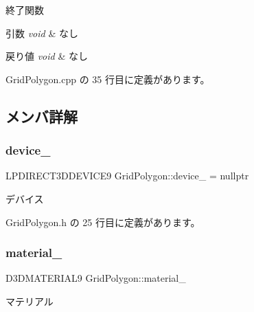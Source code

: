 終了関数 


\begin{DoxyParams}{引数}
{\em void} & なし \\
\hline
\end{DoxyParams}

\begin{DoxyRetVals}{戻り値}
{\em void} & なし \\
\hline
\end{DoxyRetVals}


 Grid\+Polygon.\+cpp の 35 行目に定義があります。



\subsection{メンバ詳解}
\mbox{\label{class_grid_polygon_a23d509ae7ad001e003897527380a8ca8}} 
\subsubsection{\texorpdfstring{device\+\_\+}{device\_}}
{\footnotesize\ttfamily L\+P\+D\+I\+R\+E\+C\+T3\+D\+D\+E\+V\+I\+C\+E9 Grid\+Polygon\+::device\+\_\+ = nullptr\hspace{0.3cm}{\ttfamily [private]}}



デバイス 



 Grid\+Polygon.\+h の 25 行目に定義があります。

\mbox{\label{class_grid_polygon_a5aabcb6eed028eb7b093ce8f4e6936a8}} 
\subsubsection{\texorpdfstring{material\+\_\+}{material\_}}
{\footnotesize\ttfamily D3\+D\+M\+A\+T\+E\+R\+I\+A\+L9 Grid\+Polygon\+::material\+\_\+\hspace{0.3cm}{\ttfamily [private]}}



マテリアル 



